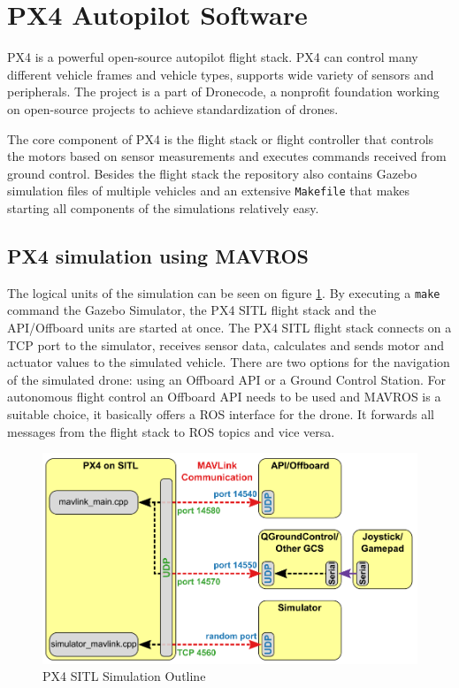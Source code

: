 \section{PX4 Autopilot Software}
PX4 is a powerful open-source autopilot flight stack. PX4 can control many different vehicle frames and vehicle 
types, supports wide variety of sensors and peripherals. The project is a part of Dronecode, a nonprofit
foundation working on open-source projects to achieve standardization of drones.\cite{PX4Website} 

The core component of PX4 is the flight stack or flight controller that controls the motors based on sensor
measurements and executes commands received from ground control. Besides the flight stack the repository 
also contains Gazebo simulation files of multiple vehicles and an extensive \verb|Makefile| that makes 
starting all components of the simulations relatively easy. 

\subsection{PX4 simulation using MAVROS}
The logical units of the simulation can be seen on figure \ref{fig:px4_sitl_simulation}.
By executing a \verb|make| command the Gazebo Simulator, the PX4 SITL flight stack and the API/Offboard units
are started at once. The PX4 SITL flight stack connects on a TCP port to the simulator, receives sensor data, 
calculates and sends motor and actuator values to the simulated vehicle. There are two options for the navigation
of the simulated drone: using an Offboard API or a Ground Control Station. For autonomous flight control an 
Offboard API needs to be used and MAVROS is a suitable choice, it basically offers a ROS interface for 
the drone. It forwards all messages from the flight stack to ROS topics and vice versa.

\begin{figure}[h]
    \centering
    \includegraphics[width=120mm, keepaspectratio]{figures/px4_sitl_overview.png}
    \caption{PX4 SITL Simulation Outline \cite{PX4Simulation}}
    \label{fig:px4_sitl_simulation}
\end{figure}

